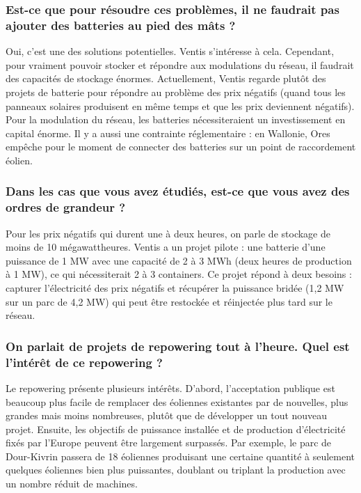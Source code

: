 \subsubsection{Est-ce que pour résoudre ces problèmes, il ne faudrait pas ajouter des batteries au pied des mâts ?}

Oui, c'est une des solutions potentielles. Ventis s'intéresse à cela. Cependant, pour vraiment pouvoir stocker et répondre aux modulations du réseau, il faudrait des capacités de stockage énormes. Actuellement, Ventis regarde plutôt des projets de batterie pour répondre au problème des prix négatifs (quand tous les panneaux solaires produisent en même temps et que les prix deviennent négatifs). Pour la modulation du réseau, les batteries nécessiteraient un investissement en capital énorme. Il y a aussi une contrainte réglementaire : en Wallonie, Ores empêche pour le moment de connecter des batteries sur un point de raccordement éolien.

\subsubsection{Dans les cas que vous avez étudiés, est-ce que vous avez des ordres de grandeur ?}

Pour les prix négatifs qui durent une à deux heures, on parle de stockage de moins de 10 mégawattheures. Ventis a un projet pilote : une batterie d'une puissance de 1 MW avec une capacité de 2 à 3 MWh (deux heures de production à 1 MW), ce qui nécessiterait 2 à 3 containers. Ce projet répond à deux besoins : capturer l'électricité des prix négatifs et récupérer la puissance bridée (1,2 MW sur un parc de 4,2 MW) qui peut être restockée et réinjectée plus tard sur le réseau.

\subsubsection{On parlait de projets de repowering tout à l'heure. Quel est l'intérêt de ce repowering ?}

Le repowering présente plusieurs intérêts. D'abord, l'acceptation publique est beaucoup plus facile de remplacer des éoliennes existantes par de nouvelles, plus grandes mais moins nombreuses, plutôt que de développer un tout nouveau projet. Ensuite, les objectifs de puissance installée et de production d'électricité fixés par l'Europe peuvent être largement surpassés. Par exemple, le parc de Dour-Kivrin passera de 18 éoliennes produisant une certaine quantité à seulement quelques éoliennes bien plus puissantes, doublant ou triplant la production avec un nombre réduit de machines.

